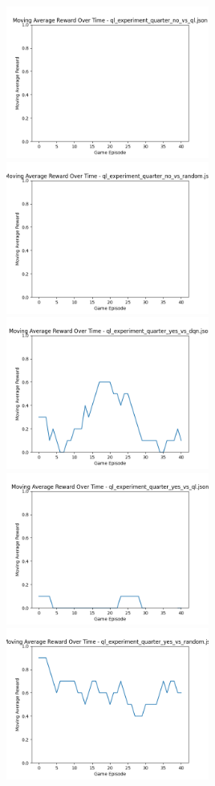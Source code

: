 \includegraphics[width=0.5\textwidth]{images/moving_average_reward_ql_experiment_quarter_no_vs_ql.png} 
\includegraphics[width=0.5\textwidth]{images/moving_average_reward_ql_experiment_quarter_no_vs_random.png} 
\includegraphics[width=0.5\textwidth]{images/moving_average_reward_ql_experiment_quarter_yes_vs_dqn.png} 
\includegraphics[width=0.5\textwidth]{images/moving_average_reward_ql_experiment_quarter_yes_vs_ql.png} 
\includegraphics[width=0.5\textwidth]{images/moving_average_reward_ql_experiment_quarter_yes_vs_random.png} 
